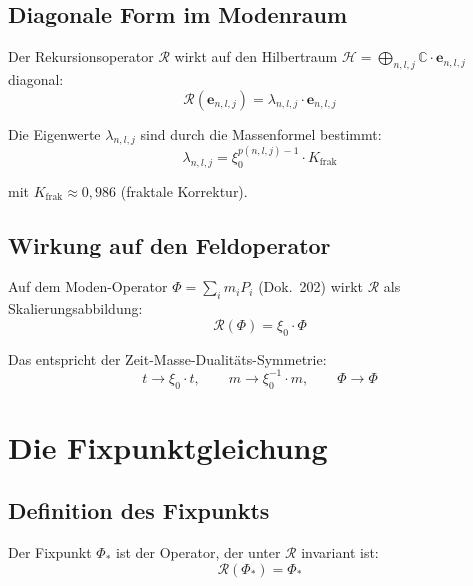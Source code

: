 \subsection{Diagonale Form im Modenraum}

Der Rekursionsoperator $\mathcal{R}$ wirkt auf den Hilbertraum
$\mathcal{H} = \bigoplus_{n,l,j}\mathbb{C}\cdot\mathbf{e}_{n,l,j}$
diagonal:
\begin{equation}
  \mathcal{R}(\mathbf{e}_{n,l,j})
  = \lambda_{n,l,j} \cdot \mathbf{e}_{n,l,j}
  \label{eq:R-diagonal}
\end{equation}

Die Eigenwerte $\lambda_{n,l,j}$ sind durch die Massenformel bestimmt:
\begin{equation}
  \lambda_{n,l,j} = \xi_0^{p(n,l,j)-1} \cdot K_{\text{frak}}
  \label{eq:eigenwerte}
\end{equation}

mit $K_{\text{frak}} \approx 0{,}986$ (fraktale Korrektur).

\subsection{Wirkung auf den Feldoperator}

Auf dem Moden-Operator $\Phi = \sum_i m_i P_i$ (Dok.~202) wirkt
$\mathcal{R}$ als Skalierungsabbildung:
\begin{equation}
  \mathcal{R}(\Phi) = \xi_0 \cdot \Phi
  \label{eq:R-auf-Phi}
\end{equation}

Das entspricht der Zeit-Masse-Dualitäts-Symmetrie:
\begin{equation}
  t \to \xi_0 \cdot t, \qquad m \to \xi_0^{-1} \cdot m,
  \qquad \Phi \to \Phi
  \label{eq:tmd-symmetrie}
\end{equation}

\section{Die Fixpunktgleichung}

\subsection{Definition des Fixpunkts}

Der Fixpunkt $\Phi_*$ ist der Operator, der unter $\mathcal{R}$
invariant ist:
\begin{equation}
  \mathcal{R}(\Phi_*) = \Phi_*
  \label{eq:fixpunkt}
\end{equation}


